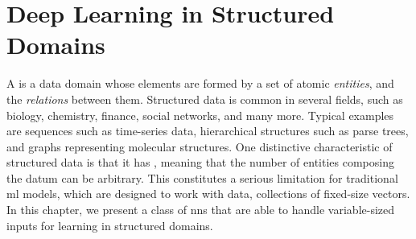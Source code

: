 \chapter{Deep Learning in Structured Domains} \label{ch:deep-learning-structures}
A  is a data domain whose elements are formed by a set of atomic \emph{entities}, and the \emph{relations} between them. Structured data is common in several fields, such as biology, chemistry, finance, social networks, and many more. Typical examples are sequences such as time-series data, hierarchical structures such as parse trees, and graphs representing molecular structures. One distinctive characteristic of structured data is that it has , meaning that the number of entities composing the datum can be arbitrary. This constitutes a serious limitation for traditional \gls{ml} models, which are designed to work with  data, \ie collections of fixed-size vectors. In this chapter, we present a class of \glspl{nn} that are able to handle variable-sized inputs for learning in structured domains.

